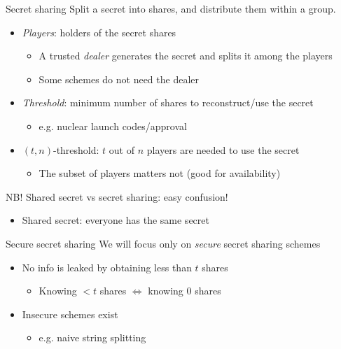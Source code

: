 \begin{frame}{Secret sharing}
  Split a secret into shares, and distribute them within a group.
  \begin{itemize}[<+(1)->]
    \item \emph{Players}: holders of the secret shares
    \begin{itemize}
      \item A trusted \emph{dealer} generates the secret and splits it among the players
      \item Some schemes do not need the dealer
    \end{itemize}
    \item \emph{Threshold}: minimum number of shares to reconstruct/use the secret
    \begin{itemize}
      \item e.g. nuclear launch codes/approval
    \end{itemize}
    \item $(t, n)$-threshold: $t$ out of $n$ players are needed to use the secret
    \begin{itemize}
      \item The subset of players matters not (good for availability)
    \end{itemize}
  \end{itemize}

  \vspace*{1em}

  \pause
  NB! Shared secret vs secret sharing: easy confusion!
  \begin{itemize}[<+(1)->]
    \item Shared secret: everyone has the same secret
  \end{itemize}
\end{frame}

\begin{frame}{Secure secret sharing}
  We will focus only on \emph{secure} secret sharing schemes
  \begin{itemize}[<+(1)->]
    \item No info is leaked by obtaining less than $t$ shares
    \begin{itemize}
      \item Knowing $<t$ shares $\iff$ knowing $0$ shares
    \end{itemize}
    \item Insecure schemes exist
    \begin{itemize}
      \item e.g. naive string splitting
    \end{itemize}
  \end{itemize}
\end{frame}

